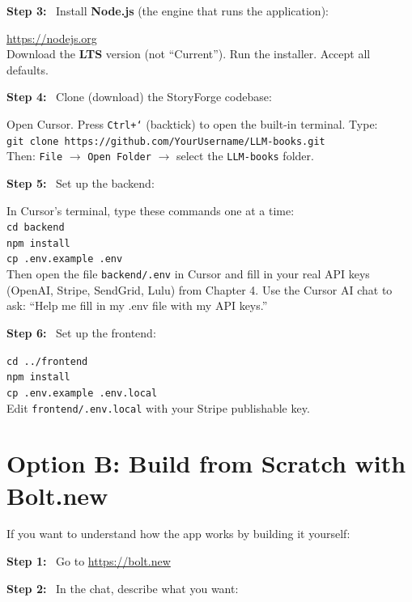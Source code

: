\documentclass[12pt, letterpaper, oneside]{book}
\newcommand{\step}[1]{\noindent\textbf{\textcolor{primary}{Step #1:}}~}
\begin{document}
\step{3} Install \textbf{Node.js} (the engine that runs the application):
\begin{actionbox}
\url{https://nodejs.org}\\[4pt]
Download the \textbf{LTS} version (not ``Current''). Run the installer. Accept all defaults.
\end{actionbox}

\step{4} Clone (download) the StoryForge codebase:
\begin{actionbox}
Open Cursor. Press \texttt{Ctrl+`} (backtick) to open the built-in terminal. Type:\\[4pt]
\texttt{git clone https://github.com/YourUsername/LLM-books.git}\\[4pt]
Then: \texttt{File} $\rightarrow$ \texttt{Open Folder} $\rightarrow$ select the \texttt{LLM-books} folder.
\end{actionbox}

\step{5} Set up the backend:
\begin{actionbox}
In Cursor's terminal, type these commands one at a time:\\[4pt]
\texttt{cd backend}\\
\texttt{npm install}\\
\texttt{cp .env.example .env}\\[4pt]
Then open the file \texttt{backend/.env} in Cursor and fill in your real API keys (OpenAI, Stripe, SendGrid, Lulu) from Chapter 4. Use the Cursor AI chat to ask: ``Help me fill in my .env file with my API keys.''
\end{actionbox}

\step{6} Set up the frontend:
\begin{actionbox}
\texttt{cd ../frontend}\\
\texttt{npm install}\\
\texttt{cp .env.example .env.local}\\[4pt]
Edit \texttt{frontend/.env.local} with your Stripe publishable key.
\end{actionbox}

\section{Option B: Build from Scratch with Bolt.new}

If you want to understand how the app works by building it yourself:

\step{1} Go to \url{https://bolt.new}

\step{2} In the chat, describe what you want:
\end{document}
